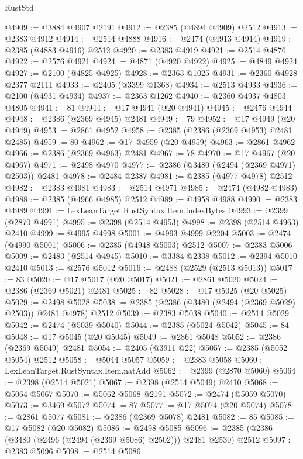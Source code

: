 \begin{lexlean}{RustStd}
\begin{coremodule}
@4909 := @3884 @4907 @2191
@4912 := @2385 (@4894 @4909) @2512
@4913 := @2383 @4912
@4914 := @2514 @4888
@4916 := @2474 (@4913 @4914)
@4919 := @2385 (@4883 @4916) @2512
@4920 := @2383 @4919
@4921 := @2514 @4876
@4922 := @2576 @4921
@4924 := @4871 (@4920 @4922)
@4925 := @4849 @4924
@4927 := @2100 (@4825 @4925)
@4928 := @2363 @1025
@4931 := @2360 @4928 @2377 @2111
@4933 := @2405 (@3399 @1368)
@4934 := @2513 @4933
@4936 := @2100 (@4931 @4934)
@4937 := @2363 @1262
@4940 := @2360 @4937 @4803 @4805
@4941 := 81
@4944 := @17 @4941 (@20 @4941)
@4945 := @2476 @4944
@4948 := @2386 (@2369 @4945) @2481
@4949 := 79
@4952 := @17 @4949 (@20 @4949)
@4953 := @2861 @4952
@4958 := @2385 (@2386 (@2369 @4953) @2481 @2485)
@4959 := 80
@4962 := @17 @4959 (@20 @4959)
@4963 := @2861 @4962
@4966 := @2386 (@2369 @4963) @2481
@4967 := 78
@4970 := @17 @4967 (@20 @4967)
@4971 := @2498 @4970
@4977 := @2386 (@3480 (@2494 (@2369 @4971) @2503)) @2481
@4978 := @2484 @2387
@4981 := @2385 (@4977 @4978) @2512
@4982 := @2383 @4981
@4983 := @2514 @4971
@4985 := @2474 (@4982 @4983)
@4988 := @2385 (@4966 @4985) @2512
@4989 := @4958 @4988
@4990 := @2383 @4989
@4991 := LexLeanTarget.RustSyntax.Item.indexBytes
@4993 := @2399 (@2870 @4991)
@4995 := @2398 (@2514 @4953)
@4998 := @2398 (@2514 @4963) @2410
@4999 := @4995 @4998
@5001 := @4993 @4999 @2204
@5003 := @2474 (@4990 @5001)
@5006 := @2385 (@4948 @5003) @2512
@5007 := @2383 @5006
@5009 := @2483 (@2514 @4945)
@5010 := @3384 @2338
@5012 := @2394 @5010 @2410
@5013 := @2576 @5012
@5016 := @2488 (@2529 (@2513 @5013))
@5017 := 83
@5020 := @17 @5017 (@20 @5017)
@5021 := @2861 @5020
@5024 := @2386 (@2369 @5021) @2481
@5025 := 82
@5028 := @17 @5025 (@20 @5025)
@5029 := @2498 @5028
@5038 := @2385 (@2386 (@3480 (@2494 (@2369 @5029) @2503)) @2481 @4978) @2512
@5039 := @2383 @5038
@5040 := @2514 @5029
@5042 := @2474 (@5039 @5040)
@5044 := @2385 (@5024 @5042)
@5045 := 84
@5048 := @17 @5045 (@20 @5045)
@5049 := @2861 @5048
@5052 := @2386 (@2369 @5049) @2481
@5054 := @2405 (@3911 @22)
@5057 := @2385 (@5052 @5054) @2512
@5058 := @5044 @5057
@5059 := @2383 @5058
@5060 := LexLeanTarget.RustSyntax.Item.natAdd
@5062 := @2399 (@2870 @5060)
@5064 := @2398 (@2514 @5021)
@5067 := @2398 (@2514 @5049) @2410
@5068 := @5064 @5067
@5070 := @5062 @5068 @2191
@5072 := @2474 (@5059 @5070)
@5073 := @3469 @5072
@5074 := 87
@5077 := @17 @5074 (@20 @5074)
@5078 := @2861 @5077
@5081 := @2386 (@2369 @5078) @2481
@5082 := 85
@5085 := @17 @5082 (@20 @5082)
@5086 := @2498 @5085
@5096 := @2385 (@2386 (@3480 (@2496 (@2494 (@2369 @5086) @2502))) @2481 @2530) @2512
@5097 := @2383 @5096
@5098 := @2514 @5086

\end{coremodule}
\end{lexlean}
